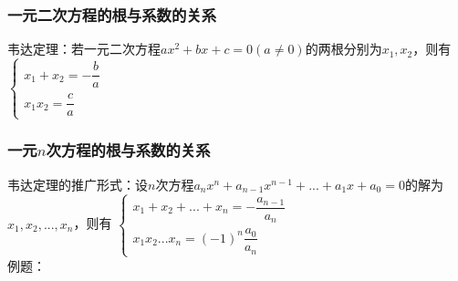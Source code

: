 \subsubsection*{一元二次方程的根与系数的关系}
韦达定理：若一元二次方程$ax^2 + bx + c = 0 (a \neq 0)$的两根分别为$x_1, x_2$，则有$\left\{\begin{array}{l}
     x_1 + x_2 = -\dfrac{b}{a}  \\
     x_1x_2 = \dfrac{c}{a}
\end{array} \right.$
\subsubsection*{一元$n$次方程的根与系数的关系}
韦达定理的推广形式：设$n$次方程$a_nx^n + a_{n-1}x^{n-1} + ... + a_1x + a_0=0$的解为$x_1, x_2, ..., x_n$，则有
$\left\{\begin{array}{l}
     x_1 + x_2 + ... + x_n = -\dfrac{a_{n-1}}{a_n}  \\
     x_1x_2...x_n = (-1)^n \dfrac{a_{0}}{a_n}
\end{array} \right.$ \\
例题：
